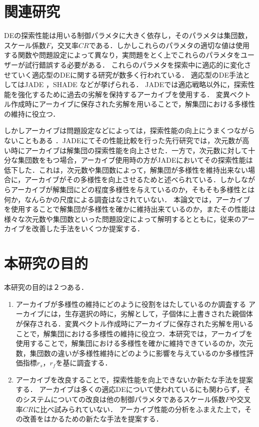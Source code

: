 \documentclass[a4paper,11pt,oneside,openany]{jsbook}
\begin{document}
\section{関連研究}
DEの探索性能は用いる制御パラメタに大きく依存し，そのパラメタは集団数，スケール係数$F$，交叉率$CR$である．しかしこれらのパラメタの適切な値は使用する関数や問題設定によって異なり，実問題をとく上でこれらのパラメタをユーザーが試行錯誤する必要がある．
これらのパラメタを探索中に適応的に変化させていく適応型のDEに関する研究が数多く行われている．
適応型のDE手法としてはJADE \cite{JADE} ，SHADE \cite{SHADE} などが挙げられる．
JADEでは適応戦略以外に，探索性能を強化するために過去の劣解を保持するアーカイブを使用する．
変異ベクトル作成時にアーカイブに保存された劣解を用いることで，解集団における多様性の維持に役立つ．

しかしアーカイブは問題設定などによっては，探索性能の向上にうまくつながらないこともある \cite{JADE} ．JADEにてその性能比較を行った先行研究では，次元数が高い時にアーカイブは解集団の探索性能を向上させた．一方で，次元数に対して十分な集団数をもつ場合，アーカイブ使用時の方がJADEにおいてその探索性能は低下した．これは，次元数や集団数によって，解集団が多様性を維持出来ない場合に，アーカイブがその多様性を向上させるためと述べられている．しかしながらアーカイブが解集団にどの程度多様性を与えているのか，そもそも多様性とは何か，なんらかの尺度による調査はなされていない．
本論文では，アーカイブを使用することで解集団が多様性を確かに維持出来ているのか，またその性能は様々な次元数や集団数といった問題設定によって解明するとともに，従来のアーカイブを改善した手法をいくつか提案する．

\section{本研究の目的}
本研究の目的は２つある．
\begin{enumerate}
\item アーカイブが多様性の維持にどのように役割をはたしているのか調査する
\vspace{3mm}
\newline
アーカイブには，生存選択の時に，劣解として，子個体に上書きされた親個体が保存される．変異ベクトル作成時にアーカイブに保存された劣解を用いることで，解集団における多様性の維持に役立つ．本研究では，アーカイブを使用することで，解集団における多様性を確かに維持できているのか，次元数，集団数の違いが多様性維持にどのように影響を与えているのか多様性評価指標$r_s$，$r_f$を基に調査する．
\newline


\item アーカイブを改良することで，探索性能を向上できないか新たな手法を提案する．
\vspace{3mm}
\newline
アーカイブは多くの適応DEについて使われているにも関わらず，そのシステムについての改良は他の制御パラメタであるスケール係数$F$や交叉率$CR$に比べ試みられていない．
アーカイブ性能の分析をふまえた上で，その改善をはかるための新たな手法を提案する．
\end{enumerate}
\end{document}

